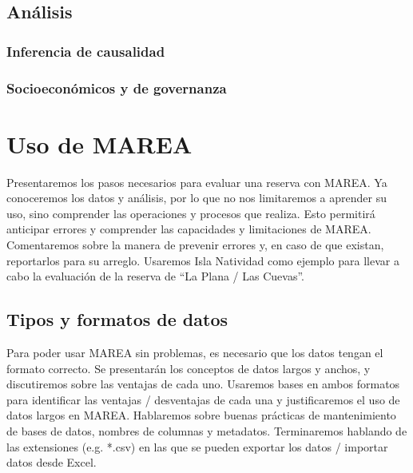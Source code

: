 \documentclass[]{krantz}
\begin{document}
\hypertarget{analisis}{%
\section{Análisis}\label{analisis}}

\hypertarget{inferencia-de-causalidad}{%
\subsection{Inferencia de causalidad}\label{inferencia-de-causalidad}}

\hypertarget{socioeconomicos-y-de-governanza}{%
\subsection{Socioeconómicos y de
governanza}\label{socioeconomicos-y-de-governanza}}

\hypertarget{uso-de-marea}{%
\chapter{Uso de MAREA}\label{uso-de-marea}}

Presentaremos los pasos necesarios para evaluar una reserva con MAREA.
Ya conoceremos los datos y análisis, por lo que no nos limitaremos a
aprender su uso, sino comprender las operaciones y procesos que realiza.
Esto permitirá anticipar errores y comprender las capacidades y
limitaciones de MAREA. Comentaremos sobre la manera de prevenir errores
y, en caso de que existan, reportarlos para su arreglo. Usaremos Isla
Natividad como ejemplo para llevar a cabo la evaluación de la reserva de
``La Plana / Las Cuevas''.

\hypertarget{tipos-y-formatos-de-datos}{%
\section{Tipos y formatos de datos}\label{tipos-y-formatos-de-datos}}

Para poder usar MAREA sin problemas, es necesario que los datos tengan
el formato correcto. Se presentarán los conceptos de datos largos y
anchos, y discutiremos sobre las ventajas de cada uno. Usaremos bases en
ambos formatos para identificar las ventajas / desventajas de cada una y
justificaremos el uso de datos largos en MAREA. Hablaremos sobre buenas
prácticas de mantenimiento de bases de datos, nombres de columnas y
metadatos. Terminaremos hablando de las extensiones (e.g. *.csv) en las
que se pueden exportar los datos / importar datos desde Excel.
\end{document}
